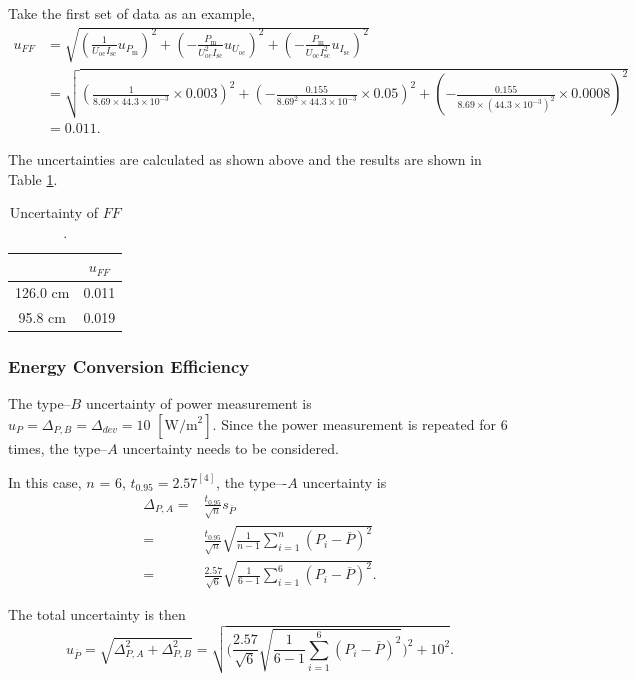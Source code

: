 \documentclass[a4paper]{article}
\begin{document}
Take the first set of data as an example,
\begin{align*}
	u_{FF} & = \sqrt{(\frac{1}{U_\text{oc}I_\text{sc}}u_{P_\text{m}})^2 + (-\frac{P_\text{m}}{U_\text{oc}^2I_\text{sc}}u_{U_\text{oc}})^2 + (-\frac{P_\text{m}}{U_\text{oc}I_\text{sc}^2}u_{I_\text{sc}})^2}      \\
	       & = \sqrt{(\frac{1}{8.69\times 44.3\times 10^{-3}}\times 0.003)^2 + (-\frac{0.155}{8.69^2\times 44.3\times 10^{-3}}\times 0.05)^2 + (-\frac{0.155}{8.69\times (44.3\times 10^{-3})^2}\times 0.0008)^2} \\
	       & = 0.011.
\end{align*}

The uncertainties are calculated as shown above and the results are shown in Table \ref{table::unFF}.

\begin{table}[H]
	\centering
	\begin{tabular}{cc}
		\hline
		         & $u_{FF}$ \\
		\hline
		126.0 cm & 0.011    \\
		95.8 cm  & 0.019    \\
		\hline
	\end{tabular}
	\caption{Uncertainty of $FF$.}
	\label{table::unFF}
\end{table}

\subsubsection{Energy Conversion Efficiency}

The type--$B$ uncertainty of power measurement is $u_{P} = \Delta_{P,B} = \Delta_{dev} = 10\,\,[\text{W/m}^2]$. Since the power measurement is repeated for 6 times, the type--$A$ uncertainty needs to be considered.

In this case, $n$ = 6, $t_{0.95} = 2.57^{[4]}$, the type–-$A$ uncertainty is
\begin{align*}
	\Delta_{P,A} = & \frac{t_{0.95}}{\sqrt{n}} s_{\overline{P}}                                                \\
	=              & \frac{t_{0.95}}{\sqrt{n}} \sqrt{\frac{1}{n-1}\sum \limits_{i=1}^{n}(P _i-\overline{P})^2} \\
	=              & \frac{2.57}{\sqrt{6}}\sqrt{\frac{1}{6-1}\sum \limits_{i=1}^{6}(P_i-\overline{P})^2}.
\end{align*}

The total uncertainty is then
$$u_{\overline{P}} = \sqrt{\Delta_{P,A}^2+\Delta_{P,B}^2} = \sqrt{\bigg(\frac{2.57}{\sqrt{6}}\sqrt{\frac{1}{6-1}\sum \limits_{i=1}^{6}(P_i-\overline{P})^2}\bigg)^2+10^2}.$$
\end{document}
